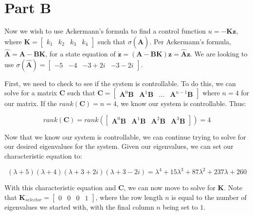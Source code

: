 \documentclass{article}
\begin{document}
\section*{Part B}

Now we wish to use Ackermann's formula to find a control function $u=-\boldsymbol{K}\boldsymbol{z}$, where $\boldsymbol{K}=\begin{bmatrix}k_1 & k_2 & k_3 & k_4\end{bmatrix}$ such that $\sigma(\hat{\boldsymbol{A}})$. Per Ackermann's formula, $\hat{\boldsymbol{A}} = \boldsymbol{A}-\boldsymbol{B}\boldsymbol{K}$, for a state equation of $\dot{\boldsymbol{z}} = (\boldsymbol{A}-\boldsymbol{B}\boldsymbol{K})\boldsymbol{z} = \hat{\boldsymbol{A}}\boldsymbol{z}$. We are looking to use $\sigma(\hat{\boldsymbol{A}}) = \begin{bmatrix}
    -5 &
    -4 &
    -3+2i &
    -3-2i
\end{bmatrix}$.

First, we need to check to see if the system is controllable. To do this, we can solve for a matrix $\boldsymbol{C}$ such that $
    \boldsymbol{C} = \begin{bmatrix}
        \boldsymbol{A}^0\boldsymbol{B} & \boldsymbol{A}^1\boldsymbol{B} & \ldots & \boldsymbol{A}^{n-1}\boldsymbol{B}
    \end{bmatrix}$ where $n=4$ for our matrix. If the $rank(\boldsymbol{C})=n=4$, we know our system is controllable. Thus:

\begin{equation}
    rank(\boldsymbol{C}) = rank(\begin{bmatrix}
        \boldsymbol{A}^0\boldsymbol{B} & \boldsymbol{A}^1\boldsymbol{B} & \boldsymbol{A}^2\boldsymbol{B} & \boldsymbol{A}^3\boldsymbol{B}
    \end{bmatrix}) = 4
\end{equation}

Now that we know our system is controllable, we can continue trying to solve for our desired eigenvalues for the system. Given our eigenvalues, we can set our characteristic equation to:

\begin{equation}
    (\lambda+5)(\lambda+4)(\lambda+3+2i)(\lambda+3-2i)=\lambda^4+15\lambda^3+87\lambda^2+237\lambda+260
\end{equation}

With this characteristic equation and $\boldsymbol{C}$, we can now move to solve for $\boldsymbol{K}$. Note that $\boldsymbol{K}_{selector} =\begin{bmatrix}0 & 0 & 0 & 1\end{bmatrix}$, where the row length $n$ is equal to the number of eigenvalues we started with, with the final column $n$ being set to $1$.  
\end{document}
